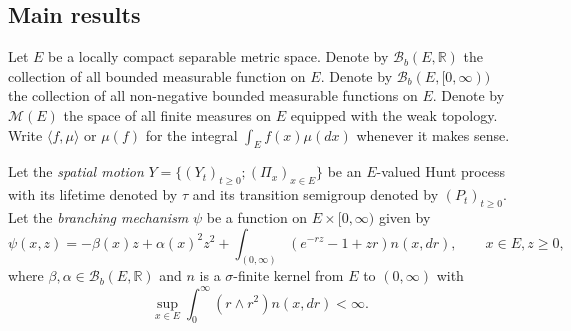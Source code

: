 \documentclass[12pt,a4paper]{amsart}
\numberwithin{equation}{section}
\theoremstyle{plain}
\theoremstyle{definition}
\begin{document}
\subsection{Main results}
\label{sec:main-results}
Let $E$ be a locally compact separable metric space. 
Denote by $\mathcal B_b(E,\mathbb R)$ the collection of all bounded measurable function on
$E$. 
Denote by $\mathcal B_b(E, [0,\infty))$ the collection of all non-negative bounded measurable functions on $E$. 
Denote by $\mathcal M(E)$ the space of all finite measures on $E$ equipped with the weak topology. 
Write $\langle f,\mu\rangle$ or $\mu(f)$ for the integral $\int_E f(x)\mu(dx)$ whenever it makes sense.

Let the \emph{spatial motion} $Y=\{(Y_t)_{t\geq 0};(\Pi_x)_{x\in E}\}$ be an $E$-valued Hunt process with its lifetime denoted by $\tau$ and its transition semigroup denoted by $(P_t)_{t\geq
  0}$. 
Let the \emph{branching mechanism} $\psi$ be a function on $E\times[0,\infty)$ given by
\[
	\psi(x,z)
	=-\beta(x)z + \alpha(x)^2 z^2+ \int_{(0,\infty)} (e^{-rz}-1+zr )n(x, dr),\qquad x\in E, z\geq0,
\]
where $\beta, \alpha\in \mathcal B_b(E,\mathbb R)$ and $n$ is a $\sigma$-finite kernel from $E$ to $(0,\infty)$ with
\[
	\sup_{x\in E}\int_0^\infty (r\wedge r^2)n(x,dr)
	<\infty.
\]
\end{document}
